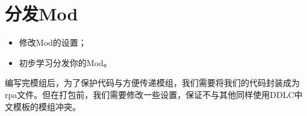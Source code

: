 \chapter{分发Mod}

\begin{ChapterGoals}
    \begin{itemize}
        \item 修改Mod的设置；
        \item 初步学习分发你的Mod。
    \end{itemize}
\end{ChapterGoals}

编写完模组后，为了保护代码与方便传递模组，我们需要将我们的代码封装成为rpa文件。但在打包前，我们需要修改一些设置，保证不与其他同样使用DDLC中文模板的模组冲突。


